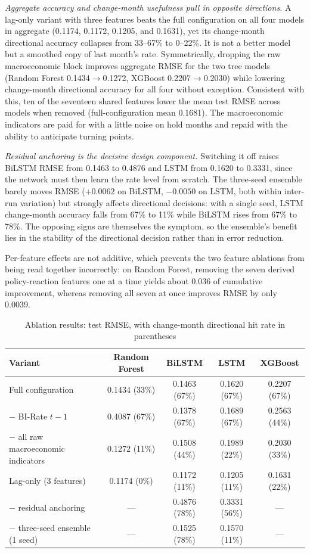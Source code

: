 \documentclass[conference]{IEEEtran}
\begin{document}
\emph{Aggregate accuracy and change-month usefulness pull in opposite directions.} A lag-only variant with three features beats the full configuration on all four models in aggregate (0.1174, 0.1172, 0.1205, and 0.1631), yet its change-month directional accuracy collapses from 33--67\% to 0--22\%. It is not a better model but a smoothed copy of last month's rate. Symmetrically, dropping the raw macroeconomic block improves aggregate RMSE for the two tree models (Random Forest 0.1434$\rightarrow$0.1272, XGBoost 0.2207$\rightarrow$0.2030) while lowering change-month directional accuracy for all four without exception. Consistent with this, ten of the seventeen shared features lower the mean test RMSE across models when removed (full-configuration mean 0.1681). The macroeconomic indicators are paid for with a little noise on hold months and repaid with the ability to anticipate turning points.

\emph{Residual anchoring is the decisive design component.} Switching it off raises BiLSTM RMSE from 0.1463 to 0.4876 and LSTM from 0.1620 to 0.3331, since the network must then learn the rate level from scratch. The three-seed ensemble barely moves RMSE ($+0.0062$ on BiLSTM, $-0.0050$ on LSTM, both within inter-run variation) but strongly affects directional decisions: with a single seed, LSTM change-month accuracy falls from 67\% to 11\% while BiLSTM rises from 67\% to 78\%. The opposing signs are themselves the symptom, so the ensemble's benefit lies in the stability of the directional decision rather than in error reduction.

Per-feature effects are not additive, which prevents the two feature ablations from being read together incorrectly: on Random Forest, removing the seven derived policy-reaction features one at a time yields about 0.036 of cumulative improvement, whereas removing all seven at once improves RMSE by only 0.0039.

\begin{table}[htbp]
\caption{Ablation results: test RMSE, with change-month directional hit rate in parentheses}
\begin{center}
\begin{tabular}{lcccc}
\toprule
\textbf{Variant} & \textbf{Random Forest} & \textbf{BiLSTM} & \textbf{LSTM} & \textbf{XGBoost} \\
\midrule
Full configuration & 0.1434 (33\%) & 0.1463 (67\%) & 0.1620 (67\%) & 0.2207 (67\%) \\
$-$ BI-Rate $t-1$ & 0.4087 (67\%) & 0.1378 (67\%) & 0.1689 (67\%) & 0.2563 (44\%) \\
$-$ all raw macroeconomic indicators & 0.1272 (11\%) & 0.1508 (44\%) & 0.1989 (22\%) & 0.2030 (33\%) \\
Lag-only (3 features) & 0.1174 (0\%) & 0.1172 (11\%) & 0.1205 (11\%) & 0.1631 (22\%) \\
$-$ residual anchoring & --- & 0.4876 (78\%) & 0.3331 (56\%) & --- \\
$-$ three-seed ensemble (1 seed) & --- & 0.1525 (78\%) & 0.1570 (11\%) & --- \\
\bottomrule
\end{tabular}
\label{tab:ablation}
\end{center}
\end{table}
\end{document}
